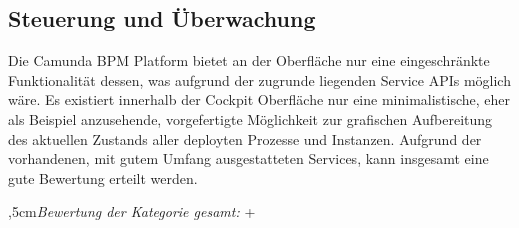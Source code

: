 \subsection{Steuerung und Überwachung}
\label{camundaSteuerung}
Die Camunda BPM Platform bietet an der Oberfläche nur eine eingeschränkte Funktionalität dessen, was aufgrund der zugrunde liegenden Service APIs möglich wäre. Es existiert innerhalb der Cockpit Oberfläche nur eine minimalistische, eher als Beispiel anzusehende, vorgefertigte Möglichkeit zur grafischen Aufbereitung des aktuellen Zustands aller deployten Prozesse und Instanzen. Aufgrund der vorhandenen, mit gutem Umfang ausgestatteten Services, kann insgesamt eine gute Bewertung erteilt werden.

\bigskip{},5cm\textit{Bewertung der Kategorie gesamt:} \hspace{5mm} \textcircled{+}
\leftskip=0cm

